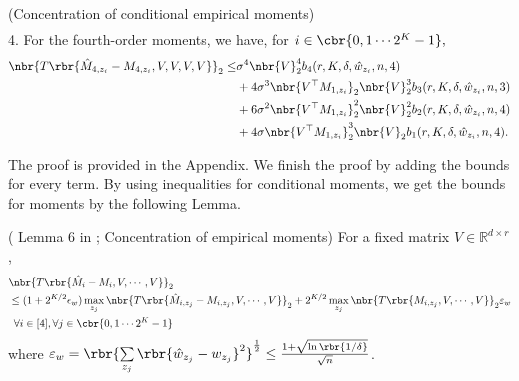\documentclass[twoside,11pt]{article}
\begin{document}
{\begin{lemma}{(Concentration of conditional empirical moments)}
\begin{align*}
  \end{align*}
4. For the fourth-order moments, we have, for $ i \in \cbr{0,1 \cdots 2^K-1},$
  \begin{align*}
    \nbr{ T \rbr{\hat{M}_{4,z_i} - M_{4,z_i},V,V,V,V}}_2 \leq& \sigma^4 \nbr{V}_2^4  b_4(r, K, \delta, \hat{w}_{z_i}, n, 4)\\
    &+ 4  \sigma^3 \nbr{V^\top M_{1,z_i}}_2 \nbr{V}_2^3 b_3(r, K, \delta, \hat{w}_{z_i}, n, 3) \nonumber\\
    & + 6\sigma^2 \nbr{V^\top M_{1,z_i}}_2^2  \nbr{V}_2^2 b_2(r, K, \delta, \hat{w}_{z_i}, n, 4)\nonumber\\
    & + 4 \sigma \nbr{V^\top M_{1,z_i}}_2^3  \nbr{V}_2 b_1(r, K, \delta, \hat{w}_{z_i}, n, 4).
  \end{align*} 
\end{lemma}
The proof is provided in the Appendix. We finish the proof by adding the bounds for every term. By using inequalities for conditional moments, we get the bounds for moments by the following Lemma.



\begin{lemma}{( Lemma 6 in \cite{HsuKak12}; Concentration of empirical moments)}
 \label{lem:moments}
For a fixed matrix $V \in \mathbb{R}^{d \times r}$,
  \begin{align*} 
    &\nbr{T\rbr{\hat{M}_i - M_i,V, \cdots, V}}_2 \\
    &\leq (1+ 2^{K/2} \epsilon_w) \max_{z_j } \nbr{T\rbr{\hat{M}_{i,z_j} - M_{i,z_j},V, \cdots, V}}_2  + 2^{K/2}\max_{z_j} \nbr{T\rbr{M_{i,z_j}, V, \cdots, V}}_2\varepsilon_{w} \\
    &\,\,\, \forall i \in [4],\forall j \in \cbr{0,1 \cdots 2^K-1}
  \end{align*}
where $\varepsilon_{w} = \rbr{ \sum \limits_{z_j} \rbr{ \hat{w}_{z_j}-w_{z_j} }^2}^{\frac{1}{2}} \leq \frac{1+\sqrt{\ln \rbr{1/\delta}}}{\sqrt{n}}$.

\end{lemma}


}
\end{document}

